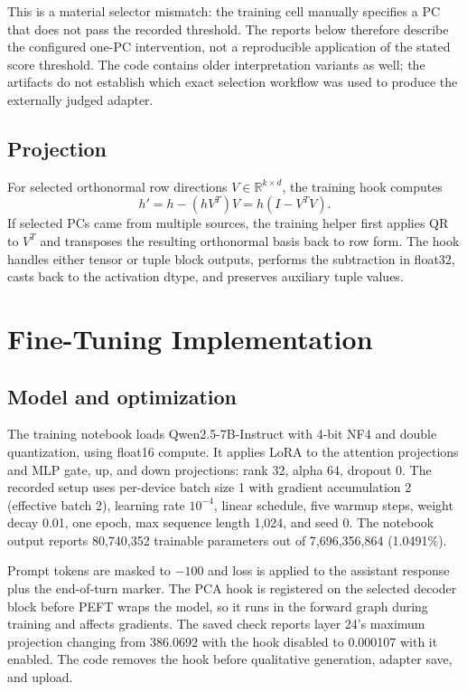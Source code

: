 \documentclass[11pt]{article}
\begin{document}
This is a material selector mismatch: the training cell manually specifies a PC that does not pass the recorded threshold. The reports below therefore describe the configured one-PC intervention, not a reproducible application of the stated score threshold. The code contains older interpretation variants as well; the artifacts do not establish which exact selection workflow was used to produce the externally judged adapter.

\subsection{Projection}
For selected orthonormal row directions $V\in\mathbb{R}^{k\times d}$, the training hook computes
\[
  h'=h-(hV^T)V=h(I-V^TV).
\]
If selected PCs came from multiple sources, the training helper first applies QR to $V^T$ and transposes the resulting orthonormal basis back to row form. The hook handles either tensor or tuple block outputs, performs the subtraction in float32, casts back to the activation dtype, and preserves auxiliary tuple values.

\newpage
\section{Fine-Tuning Implementation}
\subsection{Model and optimization}
The training notebook loads Qwen2.5-7B-Instruct with 4-bit NF4 and double quantization, using float16 compute. It applies LoRA to the attention projections and MLP gate, up, and down projections: rank 32, alpha 64, dropout 0. The recorded setup uses per-device batch size 1 with gradient accumulation 2 (effective batch 2), learning rate $10^{-4}$, linear schedule, five warmup steps, weight decay 0.01, one epoch, max sequence length 1,024, and seed 0. The notebook output reports 80,740,352 trainable parameters out of 7,696,356,864 (1.0491\%).

Prompt tokens are masked to $-100$ and loss is applied to the assistant response plus the end-of-turn marker. The PCA hook is registered on the selected decoder block before PEFT wraps the model, so it runs in the forward graph during training and affects gradients. The saved check reports layer 24's maximum projection changing from 386.0692 with the hook disabled to 0.000107 with it enabled. The code removes the hook before qualitative generation, adapter save, and upload.
\end{document}
